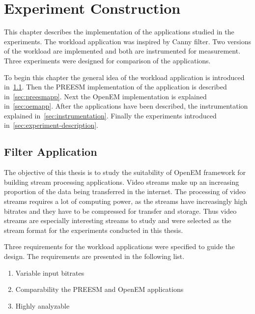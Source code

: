 \chapter{Experiment Construction}
\label{chapter:construction}
This chapter describes the implementation of the applications studied in the experiments. The workload application was inspired by Canny filter. Two versions of the workload are implemented and both are instrumented for measurement. Three experiments were designed for comparison of the applications.

To begin this chapter the general idea of the workload application is introduced in~\ref{sec:filterapp}. Then the PREESM implementation of the application is described in~\ref{sec:preesmapp}. Next the OpenEM implementation is explained in~\ref{sec:oemapp}. After the applications have been described, the instrumentation explained in~\ref{sec:instrumentation}. Finally the experiments introduced in~\ref{sec:experiment-description}.

\section{Filter Application}
\label{sec:filterapp}
The objective of this thesis is to study the suitability of OpenEM framework for building stream processing applications. Video streams make up an increasing proportion of the data being transferred in the internet. The processing of video streams requires a lot of computing power, as the streams have increasingly high bitrates and they have to be compressed for transfer and storage. Thus video streams are especially interesting streams to study and were selected as the stream format for the experiments conducted in this thesis.

Three requirements for the workload applications were specified to guide the design. The requirements are presented in the following list.

\begin{enumerate}
    \item{Variable input bitrates}
    \item{Comparability the PREESM and OpenEM applications}
    \item{Highly analyzable}
\end{enumerate}

